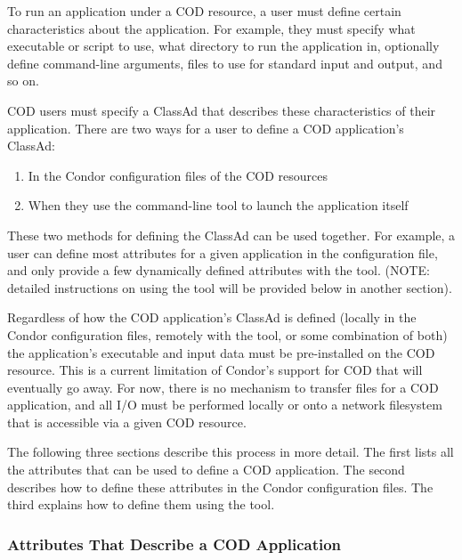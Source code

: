 To run an application under a COD resource, a user must define certain
characteristics about the application.
For example, they must specify what executable or script to use, what
directory to run the application in, optionally define command-line
arguments, files to use for standard input and output, and so on.

COD users must specify a ClassAd that describes these characteristics
of their application.  
There are two ways for a user to define a COD application's ClassAd:

\begin{enumerate}
\item In the Condor configuration files of the COD resources
\item When they use the  command-line tool to launch the
application itself
\end{enumerate}

These two methods for defining the ClassAd can be used together.
For example, a user can define most attributes for a given application
in the configuration file, and only provide a few dynamically defined
attributes with the  tool.
(NOTE: detailed instructions on using the  tool will be
provided below in another section).

Regardless of how the COD application's ClassAd is defined (locally in
the Condor configuration files, remotely with the  tool,
or some combination of both) the application's executable and input
data must be pre-installed on the COD resource.
This is a current limitation of Condor's support for COD that will
eventually go away.
For now, there is no mechanism to transfer files for a COD
application, and all I/O must be performed locally or onto a network
filesystem that is accessible via a given COD resource.

The following three sections describe this process in more detail.
The first lists all the attributes that can be used to define a COD
application.
The second describes how to define these attributes in the Condor
configuration files.
The third explains how to define them using the  tool.


\subsubsection{\label{sec:cod-application-attributes}
Attributes That Describe a COD Application}

